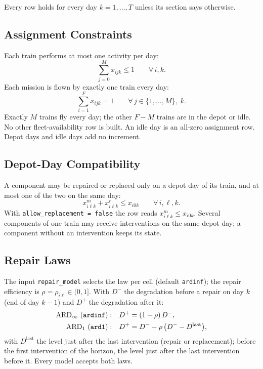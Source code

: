 Every row holds for every day $k = 1, \ldots, T$ unless its section says otherwise.

\subsection{Assignment Constraints}
\label{sec:assignment}

Each train performs at most one activity per day:
\begin{equation}
  \sum_{j=0}^{M} x_{ijk} \leq 1 \qquad \forall\, i, k .
  \label{eq:a_one_activity}
\end{equation}
Each mission is flown by exactly one train every day:
\begin{equation}
  \sum_{i=1}^{F} x_{ijk} = 1 \qquad \forall\, j \in \{1, \ldots, M\},\; k .
  \label{eq:a_coverage}
\end{equation}
Exactly $M$ trains fly every day; the other $F - M$ trains are in the depot or idle.
No other fleet-availability row is built. An idle day is an all-zero assignment row.
Depot days and idle days add no increment.

\subsection{Depot-Day Compatibility}
\label{sec:depot}

A component may be repaired or replaced only on a depot day of its train, and at most
one of the two on the same day:
\begin{equation}
  x^m_{i\ell k} + x^r_{i\ell k} \leq x_{i0k} \qquad \forall\, i, \ell, k .
  \label{eq:a_depot}
\end{equation}
With \texttt{allow\_replacement = false} the row reads $x^m_{i\ell k} \leq x_{i0k}$.
Several components of one train may receive interventions on the same depot day; a
component without an intervention keeps its state.

\subsection{Repair Laws}
\label{sec:repair_laws}

The input \texttt{repair\_model} selects the law per cell (default \texttt{ardinf});
the repair efficiency is $\rho = \rho_{i\ell} \in (0, 1]$. With $D^-$ the degradation
before a repair on day $k$ (end of day $k-1$) and $D^+$ the degradation after it:
\begin{align}
  \mathrm{ARD}_{\infty}\ (\texttt{ardinf}):&\quad D^+ = (1-\rho)\, D^- ,
    \label{eq:a_ardinf} \\
  \mathrm{ARD}_{1}\ (\texttt{ard1}):&\quad D^+ = D^- - \rho\,\bigl(D^- - D^{\mathrm{last}}\bigr),
    \label{eq:a_ard1}
\end{align}
with $D^{\mathrm{last}}$ the level just after the last intervention (repair or
replacement); before the first intervention of the horizon, the level just after the
last intervention before it. Every model accepts both laws.

